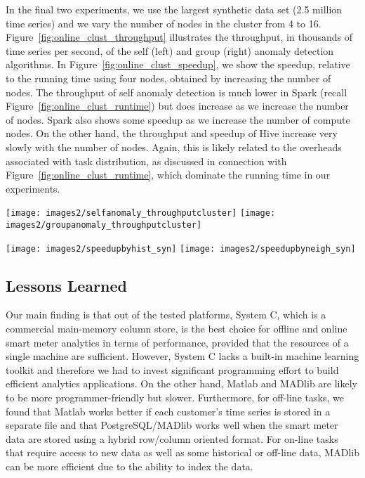 \documentclass[prodmode,acmtods]{acmsmall}
\begin{document}
In the final two experiments, we use the largest synthetic data set (2.5 million time series) and we vary the number of nodes in the cluster from 4 to 16.  Figure~\ref{fig:online_clust_throughput} illustrates the throughput, in thousands of time series per second, of the self (left) and group (right) anomaly detection algorithms. In Figure~\ref{fig:online_clust_speedup}, we show the speedup, relative to the running time using four nodes, obtained by increasing the number of nodes.  The throughput of self anomaly detection is much lower in Spark (recall Figure~\ref{fig:online_clust_runtime}) but does increase as we increase the number of nodes.  Spark also shows some speedup as we increase the number of compute nodes.  On the other hand, the throughput and speedup of Hive increase very slowly with the number of nodes.  Again, this is likely related to the overheads associated with task distribution, as discussed in connection with Figure~\ref{fig:online_clust_runtime}, which dominate the running time in our experiments.

\begin{figure*}[t]
\centering
\texttt{[image: images2/selfanomaly\_throughputcluster]}
\texttt{[image: images2/groupanomaly\_throughputcluster]}
\caption{Throughput of Spark and Hive for self (left) and group (right) anomalies.}
\label{fig:online_clust_throughput}
\end{figure*}

\begin{figure*}[t]
\centering
\texttt{[image: images2/speedupbyhist\_syn]}
\texttt{[image: images2/speedupbyneigh\_syn]}
\caption{Speedup of Spark and Hive for self (left) and group (right) anomalies.}
\label{fig:online_clust_speedup}
\end{figure*}


\subsection{Lessons Learned} 
\label{sec:discussion}

Our main finding is that out of the tested platforms, System C, which is a commercial main-memory column store, is the best choice for offline and online smart meter analytics in terms of performance, provided that the resources of a single machine are sufficient.  However, System C lacks a built-in machine learning toolkit and therefore we had to invest significant programming effort to build efficient analytics applications.  On the other hand, Matlab and MADlib are likely to be more programmer-friendly but slower.  Furthermore, for off-line tasks, we found that Matlab works better if each customer's time series is stored in a separate file and that PostgreSQL/MADlib works well when the smart meter data are stored using a hybrid row/column oriented format.  For on-line tasks that require access to new data as well as some historical or off-line data, MADlib can be more efficient due to the ability to index the data.
\end{document}

